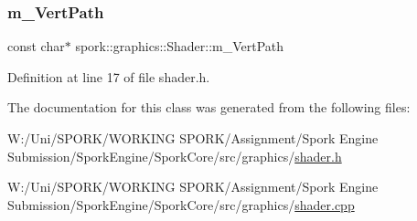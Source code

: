 \subsubsection{\texorpdfstring{m\+\_\+\+Vert\+Path}{m\_VertPath}}
{\footnotesize\ttfamily const char$\ast$ spork\+::graphics\+::\+Shader\+::m\+\_\+\+Vert\+Path\hspace{0.3cm}{\ttfamily [private]}}



Definition at line 17 of file shader.\+h.



The documentation for this class was generated from the following files\+:\begin{DoxyCompactItemize}
\item 
W\+:/\+Uni/\+S\+P\+O\+R\+K/\+W\+O\+R\+K\+I\+N\+G S\+P\+O\+R\+K/\+Assignment/\+Spork Engine Submission/\+Spork\+Engine/\+Spork\+Core/src/graphics/\hyperlink{shader_8h}{shader.\+h}\item 
W\+:/\+Uni/\+S\+P\+O\+R\+K/\+W\+O\+R\+K\+I\+N\+G S\+P\+O\+R\+K/\+Assignment/\+Spork Engine Submission/\+Spork\+Engine/\+Spork\+Core/src/graphics/\hyperlink{shader_8cpp}{shader.\+cpp}\end{DoxyCompactItemize}
